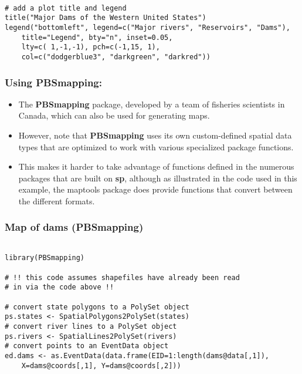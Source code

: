 \documentclass{beamer}
\begin{document}
\begin{frame}[fragile]
\begin{framed}
\begin{verbatim}
 
# add a plot title and legend
title("Major Dams of the Western United States")
legend("bottomleft", legend=c("Major rivers", "Reservoirs", "Dams"),
    title="Legend", bty="n", inset=0.05,
    lty=c( 1,-1,-1), pch=c(-1,15, 1),
    col=c("dodgerblue3", "darkgreen", "darkred"))
\end{verbatim}
\end{framed}
\end{frame}

\begin{frame}
\frametitle{Using PBSmapping:}
\begin{itemize}
\item The \textbf{PBSmapping} package, developed by a team of fisheries scientists in Canada, which can also be used for generating maps. 
\item However, note that \textbf{PBSmapping} uses its own custom-defined spatial data types that are optimized to work with various specialized package functions. 
\item This makes it harder to take advantage of functions defined in the numerous packages that are built on \textbf{sp}, although as illustrated in the code used in this example, the maptools package does provide functions that convert between the different formats.
\end{itemize}
\end{frame}



\begin{frame}[fragile]
\frametitle{Map of dams (PBSmapping)}
\begin{framed}
\begin{verbatim}

library(PBSmapping)
 
# !! this code assumes shapefiles have already been read
# in via the code above !!
 
# convert state polygons to a PolySet object
ps.states <- SpatialPolygons2PolySet(states)
# convert river lines to a PolySet object
ps.rivers <- SpatialLines2PolySet(rivers)
# convert points to an EventData object
ed.dams <- as.EventData(data.frame(EID=1:length(dams@data[,1]),
    X=dams@coords[,1], Y=dams@coords[,2]))
\end{verbatim}
\end{framed}
\end{frame}
\end{document}
